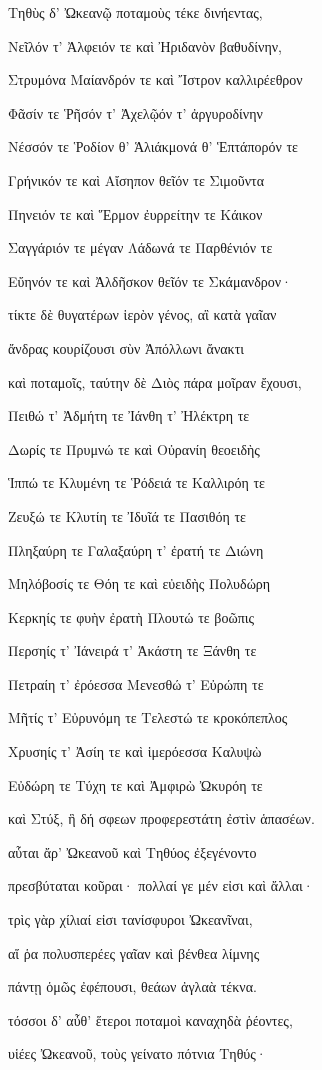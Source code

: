 \begin{pages}
\begin{Leftside}
Τηθὺς δ' Ὠκεανῷ ποταμοὺς τέκε δινήεντας,

Νεῖλόν τ' Ἀλφειόν τε καὶ Ἠριδανὸν βαθυδίνην,

Στρυμόνα Μαίανδρόν τε καὶ Ἴστρον καλλιρέεθρον

Φᾶσίν τε Ῥῆσόν τ' Ἀχελῷόν τ' ἀργυροδίνην 

Νέσσόν τε Ῥοδίον θ' Ἁλιάκμονά θ' Ἑπτάπορόν τε

Γρήνικόν τε καὶ Αἴσηπον θεῖόν τε Σιμοῦντα

Πηνειόν τε καὶ Ἕρμον ἐυρρείτην τε Κάικον

Σαγγάριόν τε μέγαν Λάδωνά τε Παρθένιόν τε

Εὔηνόν τε καὶ Ἀλδῆσκον θεῖόν τε Σκάμανδρον· 

τίκτε δὲ θυγατέρων ἱερὸν γένος, αἳ κατὰ γαῖαν

ἄνδρας κουρίζουσι σὺν Ἀπόλλωνι ἄνακτι

καὶ ποταμοῖς, ταύτην δὲ Διὸς πάρα μοῖραν ἔχουσι,

Πειθώ τ' Ἀδμήτη τε Ἰάνθη τ' Ἠλέκτρη τε

Δωρίς τε Πρυμνώ τε καὶ Οὐρανίη θεοειδὴς 

Ἱππώ τε Κλυμένη τε Ῥόδειά τε Καλλιρόη τε

Ζευξώ τε Κλυτίη τε Ἰδυῖά τε Πασιθόη τε

Πληξαύρη τε Γαλαξαύρη τ' ἐρατή τε Διώνη

Μηλόβοσίς τε Θόη τε καὶ εὐειδὴς Πολυδώρη 

Κερκηίς τε φυὴν ἐρατὴ Πλουτώ τε βοῶπις 

Περσηίς τ' Ἰάνειρά τ' Ἀκάστη τε Ξάνθη τε

Πετραίη τ' ἐρόεσσα Μενεσθώ τ' Εὐρώπη τε

Μῆτίς τ' Εὐρυνόμη τε Τελεστώ τε κροκόπεπλος

Χρυσηίς τ' Ἀσίη τε καὶ ἱμερόεσσα Καλυψὼ

Εὐδώρη τε Τύχη τε καὶ Ἀμφιρὼ Ὠκυρόη τε 

καὶ Στύξ, ἣ δή σφεων προφερεστάτη ἐστὶν ἁπασέων.

αὗται ἄρ' Ὠκεανοῦ καὶ Τηθύος ἐξεγένοντο

πρεσβύταται κοῦραι· πολλαί γε μέν εἰσι καὶ ἄλλαι·

τρὶς γὰρ χίλιαί εἰσι τανίσφυροι Ὠκεανῖναι,

αἵ ῥα πολυσπερέες γαῖαν καὶ βένθεα λίμνης 

πάντῃ ὁμῶς ἐφέπουσι, θεάων ἀγλαὰ τέκνα. 

τόσσοι δ' αὖθ' ἕτεροι ποταμοὶ καναχηδὰ ῥέοντες,

υἱέες Ὠκεανοῦ, τοὺς γείνατο πότνια Τηθύς· 


\end{Leftside}
\end{pages}
